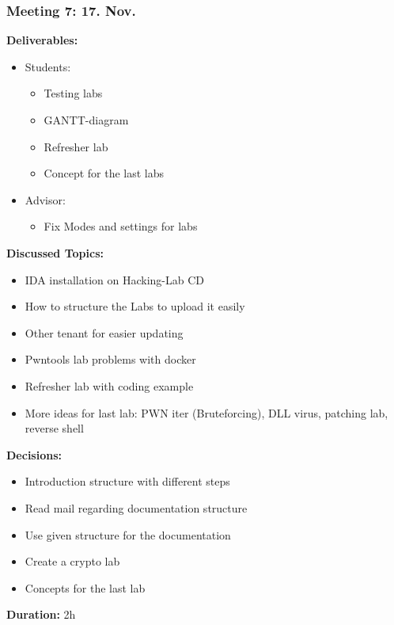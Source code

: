 \subsubsection*{Meeting 7: 17. Nov.}
\textbf{Deliverables:}
\begin{itemize}
    \item Students:
    \begin{itemize}
        \item Testing labs
        \item GANTT-diagram
        \item Refresher lab
        \item Concept for the last labs
    \end{itemize}
    \item Advisor:
    \begin{itemize}
        \item Fix Modes and settings for labs
    \end{itemize}
\end{itemize} 
\textbf{Discussed Topics:}
\begin{itemize}
    \item IDA installation on Hacking-Lab CD
    \item How to structure the Labs to upload it easily
    \item Other tenant for easier updating
    \item Pwntools lab problems with docker
    \item Refresher lab with coding example
    \item More ideas for last lab: PWN iter (Bruteforcing), DLL virus, patching lab, reverse shell
\end{itemize}
\textbf{Decisions:}
\begin{itemize}
    \item Introduction structure with different steps
    \item Read mail regarding documentation structure
    \item Use given structure for the documentation
    \item Create a crypto lab
    \item Concepts for the last lab
\end{itemize}
\textbf{Duration:} 2h

\newpage
